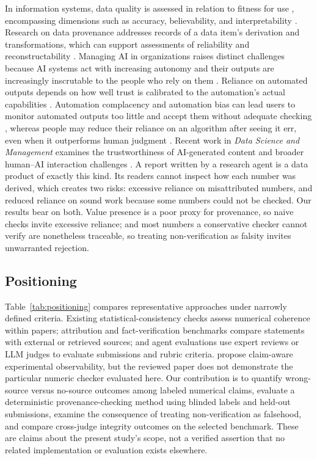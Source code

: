 \documentclass[preprint,12pt,authoryear]{elsarticle}
\begin{document}
In information systems, data quality is assessed in relation to fitness for use \citep{wang1996dataquality}, encompassing dimensions such as accuracy, believability, and interpretability \citep{wang1996dataquality,pipino2002dataquality}. Research on data provenance addresses records of a data item's derivation and transformations, which can support assessments of reliability and reconstructability \citep{simmhan2005provenance,herschel2017provenance,moreau2013prov}. Managing AI in organizations raises distinct challenges because AI systems act with increasing autonomy and their outputs are increasingly inscrutable to the people who rely on them \citep{berente2021managing}. Reliance on automated outputs depends on how well trust is calibrated to the automation's actual capabilities \citep{lee2004trust}. Automation complacency and automation bias can lead users to monitor automated outputs too little and accept them without adequate checking \citep{parasuraman2010complacency}, whereas people may reduce their reliance on an algorithm after seeing it err, even when it outperforms human judgment \citep{dietvorst2015aversion}. Recent work in \emph{Data Science and Management} examines the trustworthiness of AI-generated content and broader human--AI interaction challenges \citep{li2026aigctrust,zhou2026humanai}. A report written by a research agent is a data product of exactly this kind. Its readers cannot inspect how each number was derived, which creates two risks: excessive reliance on misattributed numbers, and reduced reliance on sound work because some numbers could not be checked. Our results bear on both. Value presence is a poor proxy for provenance, so naive checks invite excessive reliance; and most numbers a conservative checker cannot verify are nonetheless traceable, so treating non-verification as falsity invites unwarranted rejection.

\subsection{Positioning}\label{sec:rw-positioning}

Table~\ref{tab:positioning} compares representative approaches under narrowly defined criteria. Existing statistical-consistency checks assess numerical coherence within papers; attribution and fact-verification benchmarks compare statements with external or retrieved sources; and agent evaluations use expert reviews or LLM judges to evaluate submissions and rubric criteria. \citet{yin2026observability} propose claim-aware experimental observability, but the reviewed paper does not demonstrate the particular numeric checker evaluated here. Our contribution is to quantify wrong-source versus no-source outcomes among labeled numerical claims, evaluate a deterministic provenance-checking method using blinded labels and held-out submissions, examine the consequence of treating non-verification as falsehood, and compare cross-judge integrity outcomes on the selected benchmark. These are claims about the present study's scope, not a verified assertion that no related implementation or evaluation exists elsewhere.
\end{document}
